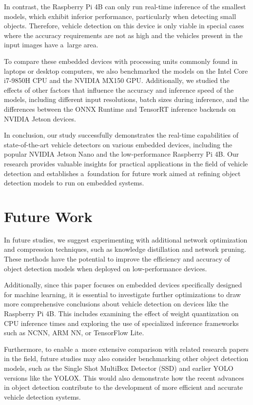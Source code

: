 In contrast, the Raspberry Pi 4B can only run real-time inference of the
smallest models, which exhibit inferior performance, particularly when detecting
small objects. Therefore, vehicle detection on this device is only viable in
special cases where the accuracy requirements are not as high and the vehicles
present in the input images have a~large area.

To compare these embedded devices with processing units commonly found in
laptops or desktop computers, we also benchmarked the models on the Intel Core
i7-9850H CPU and the NVIDIA MX150 GPU. Additionally, we studied the effects of
other factors that influence the accuracy and inference speed of the models,
including different input resolutions, batch sizes during inference, and the
differences between the ONNX Runtime and TensorRT inference backends on NVIDIA
Jetson devices.

In conclusion, our study successfully demonstrates the real-time capabilities of
state-of-the-art vehicle detectors on various embedded devices, including the
popular NVIDIA Jetson Nano and the low-performance Raspberry Pi 4B. Our research
provides valuable insights for practical applications in the field of vehicle
detection and establishes a~foundation for future work aimed at refining object
detection models to run on embedded systems.




\chapter{Future Work}
\label{FutureWork}

In future studies, we suggest experimenting with additional network optimization
and compression techniques, such as knowledge distillation and network pruning.
These methods have the potential to improve the efficiency and accuracy of
object detection models when deployed on low-performance devices.

Additionally, since this paper focuses on embedded devices specifically designed
for machine learning, it is essential to investigate further optimizations to
draw more comprehensive conclusions about vehicle detection on devices like the
Raspberry Pi 4B. This includes examining the effect of weight quantization on
CPU inference times and exploring the use of specialized inference frameworks
such as NCNN, ARM NN, or TensorFlow Lite.

Furthermore, to enable a~more extensive comparison with related research papers
in the field, future studies may also consider benchmarking other object
detection models, such as the Single Shot MultiBox Detector (SSD) and earlier
YOLO versions like the YOLOX. This would also demonstrate how the recent
advances in object detection contribute to the development of more efficient and
accurate vehicle detection systems.




